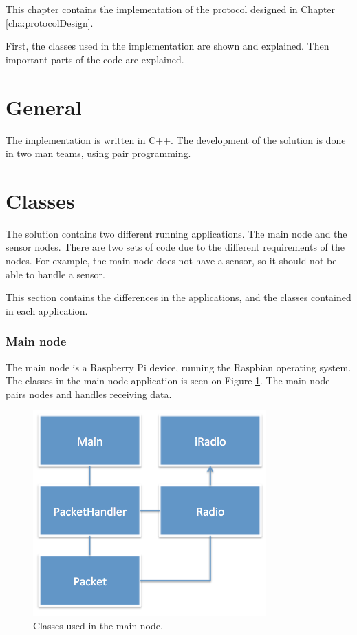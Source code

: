 This chapter contains the implementation of the protocol designed in Chapter \ref{cha:protocolDesign}. 

First, the classes used in the implementation are shown and explained. Then important parts of the code are explained.
 

\section{General}
The implementation is written in C++. The development of the solution is done in two man teams, using pair programming.

\section{Classes}
The solution contains two different running applications. The main node and the sensor nodes. There are two sets of code due to the different requirements of the nodes. For example, the main node does not have a sensor, so it should not be able to handle a sensor.

This section contains the differences in the applications, and the classes contained in each application.

\subsubsection*{Main node}
The main node is a Raspberry Pi device, running the Raspbian operating system. The classes in the main node application is seen on Figure \ref{fig:mainnodeClass}.
The main node pairs nodes and handles receiving data.

\begin{figure}[h!]
\centering
\includegraphics[width=0.8\textwidth]{chapters/implementation/figures/mainnodeClass.png}
\caption{Classes used in the main node.}
\label{fig:mainnodeClass}
\end{figure}



